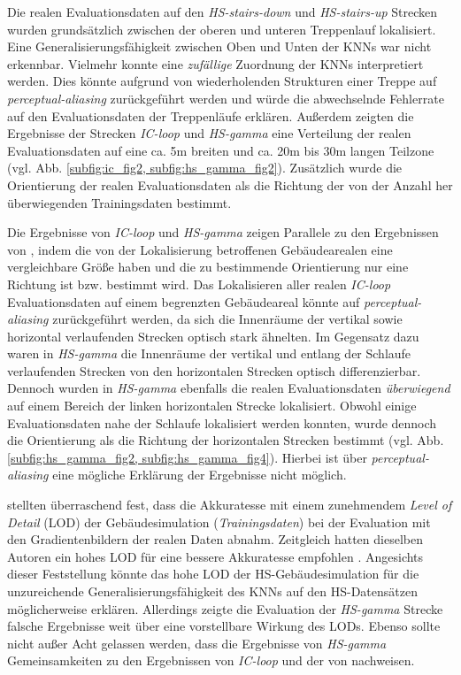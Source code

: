 Die realen Evaluationsdaten auf den \textit{HS-stairs-down} und \textit{HS-stairs-up} Strecken wurden grundsätzlich zwischen der oberen und unteren Treppenlauf lokalisiert. Eine Generalisierungsfähigkeit zwischen Oben und Unten der KNNs war nicht erkennbar. Vielmehr konnte eine \textit{zufällige} Zuordnung der KNNs interpretiert werden. Dies könnte aufgrund von wiederholenden Strukturen einer Treppe auf \textit{perceptual-aliasing} zurückgeführt werden und würde die abwechselnde Fehlerrate auf den Evaluationsdaten der Treppenläufe erklären.
Außerdem zeigten die Ergebnisse der Strecken \textit{IC-loop} und \textit{HS-gamma} eine Verteilung der realen Evaluationsdaten auf eine ca. 5m breiten und ca. 20m bis 30m langen Teilzone (vgl. Abb. \ref{subfig:ic_fig2, subfig:hs_gamma_fig2}). Zusätzlich wurde die Orientierung der realen Evaluationsdaten als die Richtung der von der Anzahl her überwiegenden Trainingsdaten bestimmt.


Die Ergebnisse von \textit{IC-loop} und \textit{HS-gamma} zeigen Parallele zu den Ergebnissen von \citet{acharyaBIMPoseNetIndoorCamera2019}, indem die von der Lokalisierung betroffenen Gebäudearealen eine vergleichbare Größe haben und die zu bestimmende Orientierung nur eine Richtung ist bzw. bestimmt wird.
Das Lokalisieren aller realen \textit{IC-loop} Evaluationsdaten auf einem begrenzten Gebäudeareal könnte auf \textit{perceptual-aliasing} zurückgeführt werden, da sich die Innenräume der vertikal sowie horizontal verlaufenden Strecken optisch stark ähnelten. Im Gegensatz dazu waren in \textit{HS-gamma} die Innenräume der vertikal und entlang der Schlaufe verlaufenden Strecken von den horizontalen Strecken optisch differenzierbar. Dennoch wurden in \textit{HS-gamma} ebenfalls die realen Evaluationsdaten \textit{überwiegend} auf einem Bereich der linken horizontalen Strecke lokalisiert. Obwohl einige Evaluationsdaten nahe der Schlaufe lokalisiert werden konnten, wurde dennoch die Orientierung als die Richtung der horizontalen Strecken bestimmt  (vgl. Abb. \ref{subfig:hs_gamma_fig2, subfig:hs_gamma_fig4}). Hierbei ist über \textit{perceptual-aliasing} eine mögliche Erklärung der Ergebnisse nicht möglich.

\citet{acharyaBIMPoseNetIndoorCamera2019} stellten überraschend fest, dass die Akkuratesse mit einem zunehmendem \textit{Level of Detail} (LOD) der Gebäudesimulation (\textit{Trainingsdaten}) bei der Evaluation mit den Gradientenbildern der realen Daten abnahm. Zeitgleich hatten dieselben Autoren ein hohes LOD für eine bessere Akkuratesse empfohlen \cite{acharyaBIMPoseNetIndoorCamera2019}. Angesichts dieser Feststellung könnte das hohe LOD der HS-Gebäudesimulation für die unzureichende Generalisierungsfähigkeit des KNNs auf den HS-Datensätzen möglicherweise erklären. Allerdings zeigte die Evaluation der \textit{HS-gamma} Strecke falsche Ergebnisse weit über eine vorstellbare Wirkung des LODs. Ebenso sollte nicht außer Acht gelassen werden, dass die Ergebnisse von \textit{HS-gamma} Gemeinsamkeiten zu den Ergebnissen von \textit{IC-loop} und der von \citet{acharyaBIMPoseNetIndoorCamera2019} nachweisen.

